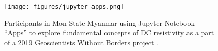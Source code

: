 \begin{figure}[!htb]
    \begin{center}
    \texttt{[image: figures/jupyter-apps.png]}
    \end{center}
\caption{
    Participants in Mon State Myanmar using Jupyter Notebook ``Apps'' to explore fundamental concepts of DC resistivity as a part of a 2019 Geoscientists Without Borders project \citep{fan2020improving}.
}
\label{fig:jupyter-apps}
\end{figure}
